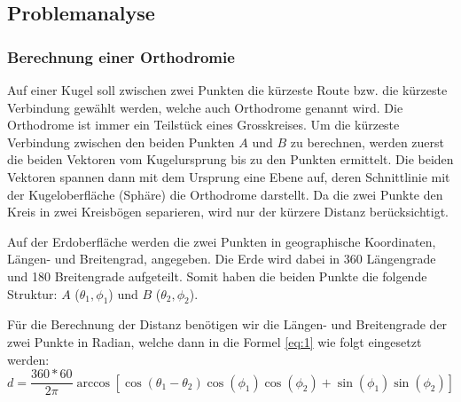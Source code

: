 \subsection{Problemanalyse}
\subsubsection{Berechnung einer Orthodromie}
Auf einer Kugel soll zwischen zwei Punkten die kürzeste Route bzw. die kürzeste
Verbindung gewählt werden, welche auch Orthodrome\cite{orthodrome} genannt wird. Die Orthodrome
ist immer ein Teilstück eines Grosskreises. Um die kürzeste Verbindung
zwischen den beiden Punkten $A$ und $B$ zu berechnen, werden zuerst die beiden
Vektoren vom Kugelursprung bis zu den Punkten ermittelt. Die beiden Vektoren
spannen dann mit dem Ursprung eine Ebene auf, deren Schnittlinie mit der
Kugeloberfläche (Sphäre) die Orthodrome darstellt. Da die zwei Punkte den Kreis
in zwei Kreisbögen separieren, wird nur der kürzere Distanz berücksichtigt.


Auf der Erdoberfläche werden die zwei Punkten in geographische Koordinaten,
Längen- und Breitengrad\cite{laengenbreitengrade}, angegeben. Die Erde wird dabei in 360 Längengrade und
180 Breitengrade aufgeteilt. Somit haben die beiden Punkte die folgende
Struktur: $A$ (\(\theta_1 , \phi_1\)) und $B$ (\(\theta_2 , \phi_2\)).

Für die Berechnung der Distanz benötigen wir die Längen- und Breitengrade der
zwei Punkte in Radian, welche dann in die Formel \eqref{eq:1} wie folgt
eingesetzt werden: \\
\begin{equation}
\label{eq:1}
 d = \frac{360*60}{2 \pi} \arccos[\cos(\theta_1 - \theta_2) \cos(\phi_1) \cos(\phi_2)+\sin(\phi_1) \sin(\phi_2)]
 \end{equation}




